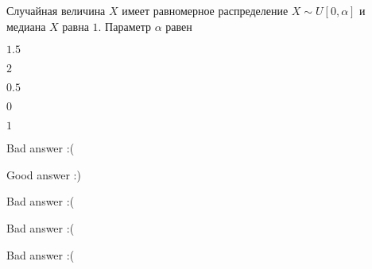 
\begin{question}
Случайная величина \(X\) имеет равномерное распределение
\(X\sim U[0,\alpha]\) и медиана \(X\) равна \(1\). Параметр \(\alpha\)
равен
\begin{answerlist}
  \item \(1.5\)
  \item \(2\)
  \item \(0.5\)
  \item \(0\)
  \item \(1\)
\end{answerlist}
\end{question}

\begin{solution}
\begin{answerlist}
  \item Bad answer :(
  \item Good answer :)
  \item Bad answer :(
  \item Bad answer :(
  \item Bad answer :(
\end{answerlist}
\end{solution}

